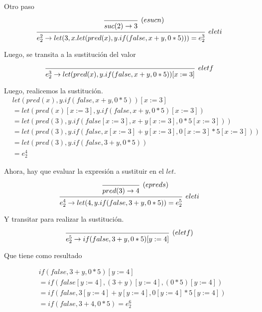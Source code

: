 \documentclass{article}
\begin{document}
\begin{enumerate}
{\begin{enumerate}
{				Otro paso

				\[
					\begin{prooftree}
						\infer 0 [$(esucn)$] {suc(2) \rightarrow 3}

						\infer 1 [$eleti$] {
							e_2^2
							\rightarrow
							let(3, x.let(pred(x), y.if(false, x+y, 0*5))) = e_2^3
						}
					\end{prooftree}	
				\]

				Luego, se transita a la sustitución del valor

				\[
					\begin{prooftree}
						\infer 0 [$eletf$] {
							e_2^3
							\rightarrow
							let(pred(x), y.if(false, x+y, 0*5))[x:=3]
						}
					\end{prooftree}
				\]

				Luego, realicemos la sustitución.
				\begin{align*}
					&let(pred(x), y.if(false, x+y, 0*5))[x:=3] \\
					&= let(pred(x)[x:=3], y.if(false, x+y, 0*5)[x:=3]) \\
					&= let(pred(3), y.if(false[x:=3], x+y[x:=3], 0*5[x:=3])) \\
					&= let(pred(3), y.if(false, x[x:=3]+y[x:=3], 0[x:=3]*5[x:=3])) \\
					&= let(pred(3), y.if(false, 3+y, 0*5)) \\
					&= e_2^4
				\end{align*}

				Ahora, hay que evaluar la expresión a sustituir en el $let$.

				\[
					\begin{prooftree}
						
						\infer 0 [$(epreds)$] {
							pred(3)
							\rightarrow
							4
						}

						\infer 1 [$eleti$] {
							e_2^4
							\rightarrow
							let(4, y.if(false, 3+y,0*5)) = e_2^5
						}
					\end{prooftree}
				\]

				Y transitar para realizar la sustitución.

				\[
					\begin{prooftree}
						\infer 0 [$(eletf)$] {
							e_2^5
							\rightarrow
							if(false, 3+y, 0*5)[y:=4]
						}
					\end{prooftree}
				\]

				Que tiene como resultado

				\begin{align*}
					&if(false, 3+y, 0*5)[y:=4] \\
					&=if(false[y:=4], (3+y)[y:=4], (0*5)[y:=4]) \\
					&=if(false, 3[y:=4]+y[y:=4], 0[y:=4]*5[y:=4]) \\
					&=if(false, 3+4, 0*5) = e_2^6
				\end{align*}

}
\end{enumerate}}
\end{enumerate}
\end{document}
